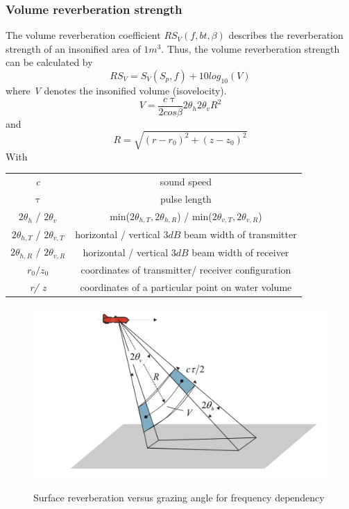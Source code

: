 \subsubsection{ Volume reverberation strength } \label{ Volume reverberation strength }
\noindent The volume reverberation coefficient \textit{$RS_{V}(f,bt,\beta)$} describes the reverberation strength of an insonified area of $1 m^3.$ Thus, the volume reverberation strength can be calculated by
\begin{equation}
\textit{$RS_V$} = \textit{$S_{V}(S_p, f)$} + 10 log_{10}{(V)}
\end{equation}
\noindent where \textit{V} denotes the insonified volume (isovelocity).
\begin{equation}
\textit{V} = \frac{ c \uptau }{ 2 cos{\beta}} 2 \theta_{h} 2 \theta_{v} R^{2}
\end{equation}
\noindent and
\begin{equation}
\textit{R} = \sqrt{ (\textit{r} - \textit{$r_{0}$})^{2} + (\textit{z} - \textit{$z_{0}$})^{2} }
\end{equation}
\noindent With
\begin{center}
\begin{tabular}{ |c|c| } 
 \hline
  \textit{c} & sound speed  \\ 
  $\uptau$ & pulse length \\ 
  $2 \theta_{h}$ / $2 \theta_{v}$ & min($2\theta_{h,T}, 2\theta_{h,R}$) / min($2\theta_{v,T}, 2\theta_{v,R}$)  \\ 
  $2\theta_{h,T}$ / $2\theta_{v,T}$ &  horizontal / vertical $3 dB$ beam width of transmitter \\
  $2\theta_{h,R}$ / $2\theta_{v,R}$ & horizontal / vertical $3 dB$ beam width of receiver \\ 
  \textit{$r_0/ z_0$} & coordinates of transmitter/ receiver configuration \\
  \textit{r/ z} & coordinates of a particular point on water volume \\
  \hline
\end{tabular}
\end{center}

\begin{figure}[H]
\centering
{\includegraphics[scale=0.40]{theory2.png}}
\caption{Surface reverberation versus grazing angle for frequency dependency}
\end{figure}

